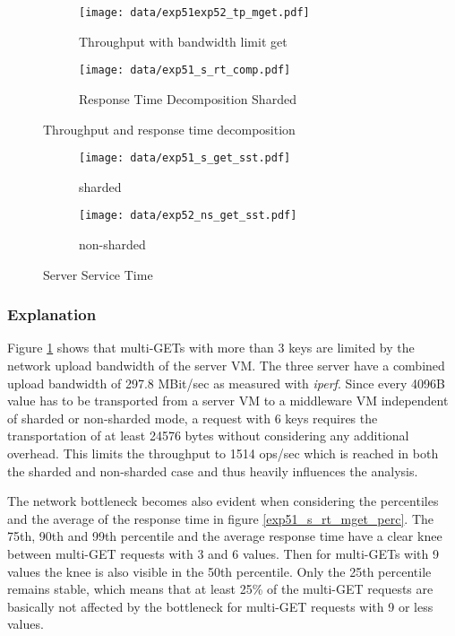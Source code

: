 \documentclass[report.tex]{subfiles}
\begin{document}
\begin{figure}
	\begin{subfigure}[b]{.49\linewidth}
		\centering
		\texttt{[image: data/exp51exp52\_tp\_mget.pdf]}
		\caption{Throughput with bandwidth limit get}\label{exp5_tp}
	\end{subfigure}\hfill
	\begin{subfigure}[b]{.49\linewidth}
		\centering
		\texttt{[image: data/exp51\_s\_rt\_comp.pdf]}
		\caption{Response Time Decomposition Sharded}\label{exp51_s_rt_comp}
	\end{subfigure}%
	\caption{Throughput and response time decomposition}
\end{figure}


\begin{figure}
	\begin{subfigure}[b]{.49\linewidth}
		\centering
		\texttt{[image: data/exp51\_s\_get\_sst.pdf]}
		\caption{sharded}\label{exp51_s_get_sst}
	\end{subfigure}\hfill
	\begin{subfigure}[b]{.49\linewidth}
		\centering
		\texttt{[image: data/exp52\_ns\_get\_sst.pdf]}
		\caption{non-sharded}\label{exp52_s_get_sst}
	\end{subfigure}%
	\caption{Server Service Time}
\end{figure}


\subsubsection{Explanation}

Figure \ref{exp5_tp} shows that multi-GETs with more than 3 keys are limited by the network upload bandwidth of the server VM. The three server have a combined upload bandwidth of 297.8 MBit/sec as measured with \emph{iperf}. Since every 4096B value has to be transported from a server VM to a middleware VM independent of sharded or non-sharded mode, a request with 6 keys requires the transportation of at least 24576 bytes without considering any additional overhead. This limits the throughput to 1514 ops/sec which is reached in both the sharded and non-sharded case and thus heavily influences the analysis.

The network bottleneck becomes also evident when considering the percentiles and the average of the response time in figure \ref{exp51_s_rt_mget_perc}. The 75th, 90th and 99th percentile and the average response time have a clear knee between multi-GET requests with 3 and 6 values. Then for multi-GETs with 9 values the knee is also visible in the 50th percentile. Only the 25th percentile remains stable, which means that at least 25\% of the multi-GET requests are basically not affected by the bottleneck for multi-GET requests with 9 or less values.
\end{document}
